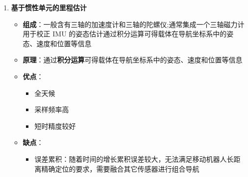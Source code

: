 \documentclass[../main.tex]{subfiles}
\begin{document}
\begin{enumerate}
\begin{itemize}
\begin{itemize}
\begin{itemize}
                \end{itemize}
            \end{itemize}
        \end{itemize}
    \item \textbf{基于惯性单元的里程估计}\label{imu}
        \begin{itemize}
            \item \textbf{组成}：一般含有三轴的加速度计和三轴的陀螺仪;通常集成一个三轴磁力计用于校正 IMU 的姿态估计通过积分运算可得载体在导航坐标系中的姿态、速度和位置等信息
            \item \textbf{原理}：通过\textbf{积分运算}可得载体在导航坐标系中的姿态、速度和位置等信息
            \item \textbf{优点}：
                \begin{itemize}
                    \item 全天候
                    \item 采样频率高
                    \item 短时精度较好
                \end{itemize}
            \item \textbf{缺点}：
                \begin{itemize}
                    \item 误差累积：随着时间的增长累积误差较大，无法满足移动机器人长距
离精确定位的要求，需要融合其它传感器进行组合导航
                \end{itemize}
        \end{itemize}

\end{enumerate}
\end{document}
